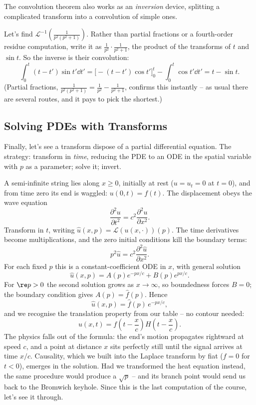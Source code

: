 The convolution theorem also works as an \emph{inversion} device, splitting a complicated transform into a convolution of simple ones.

\begin{example}
	Let's find $\mathcal{L}^{-1}\left(\frac{1}{p^2(p^2+1)}\right)$. Rather than partial fractions or a fourth-order residue computation, write it as $\frac{1}{p^2} \cdot \frac{1}{p^2 + 1}$, the product of the transforms of $t$ and $\sin t$. So the inverse is their convolution:
	$$
	\int_0^t (t - t')\sin t' \dd t' = \Big[-(t - t')\cos t'\Big]_0^t - \int_0^t \cos t' \dd t' = t - \sin t.
	$$
	(Partial fractions, $\frac{1}{p^2(p^2+1)} = \frac{1}{p^2} - \frac{1}{p^2 + 1}$, confirms this instantly -- as usual there are several routes, and it pays to pick the shortest.)
\end{example}

\subsection{Solving PDEs with Transforms}

Finally, let's see a transform dispose of a partial differential equation. The strategy: transform in \emph{time}, reducing the PDE to an ODE in the spatial variable with $p$ as a parameter; solve it; invert.

\begin{example}
	A semi-infinite string lies along $x \geq 0$, initially at rest ($u = u_t = 0$ at $t = 0$), and from time zero its end is waggled: $u(0, t) = f(t)$. The displacement obeys the wave equation
	$$
	\frac{\partial^2 u}{\partial t^2} = c^2 \frac{\partial^2 u}{\partial x^2}.
	$$
	Transform in $t$, writing $\hat u(x, p) = \mathcal L(u(x, \cdot))(p)$. The time derivatives become multiplications, and the zero initial conditions kill the boundary terms:
	$$
	p^2 \hat u = c^2 \frac{\partial^2 \hat u}{\partial x^2}.
	$$
	For each fixed $p$ this is a constant-coefficient ODE in $x$, with general solution
	$$
	\hat u(x, p) = A(p) e^{-px/c} + B(p) e^{px/c}.
	$$
	For $\re p > 0$ the second solution grows as $x \to \infty$, so boundedness forces $B = 0$; the boundary condition gives $A(p) = \hat f(p)$. Hence
	$$
	\hat u(x, p) = \hat f(p) \, e^{-px/c},
	$$
	and we recognise the translation property from our table -- no contour needed:
	$$
	u(x, t) = f\left(t - \frac xc\right) H\left(t - \frac xc\right).
	$$
	The physics falls out of the formula: the end's motion propagates rightward at speed $c$, and a point at distance $x$ sits perfectly still until the signal arrives at time $x/c$. Causality, which we built into the Laplace transform by fiat ($f = 0$ for $t < 0$), emerges in the solution. Had we transformed the heat equation instead, the same procedure would produce a $\sqrt p$ -- and its branch point would send us back to the Bromwich keyhole. Since this is the last computation of the course, let's see it through.
\end{example}

